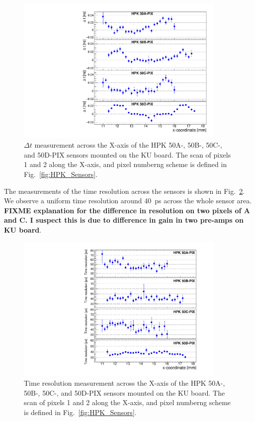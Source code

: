 \documentclass[preprint,1p]{elsarticle}
\begin{document}
\begin{figure}[htbp] 
\centering
\includegraphics[width=0.9\textwidth]{figs/KUBoard_HPK50ABCD/KUBoard_50ABCD_MeanTime.pdf} 
\caption{$\Delta t$ measurement across the X-axis of the HPK 50A-, 50B-, 50C-, and 50D-PIX sensors mounted on the KU board. The scan of pixels 1 and 2 along the X-axis, and pixel numberng scheme is defined in Fig.~\ref{fig:HPK_Sensors}.} 
\label{fig:KUBoard_50ABCD_MeanTime} 
\end{figure} 

The measurements of the time resolution across the sensors is shown in
Fig.~\ref{fig:KUBoard_50ABCD_TimeResolution}. We observe a uniform time
resolution around 40~ps across the whole sensor area. \textbf {FIXME explanation
for the difference in resolution on two pixels of A and C. I suspect this is due
to difference in gain in two pre-amps on KU board}.


\begin{figure}[htbp] 
\centering
\includegraphics[width=0.9\textwidth]{figs/KUBoard_HPK50ABCD/KUBoard_50ABCD_TimeResolution.pdf} 
\caption{Time resolution measurement across the X-axis of the HPK 50A-, 50B-, 50C-, and 50D-PIX sensors mounted on the KU board. The scan of pixels 1 and 2 along the X-axis, and pixel numberng scheme is defined in Fig.~\ref{fig:HPK_Sensors}.} 
\label{fig:KUBoard_50ABCD_TimeResolution} 
\end{figure} 
\end{document}

